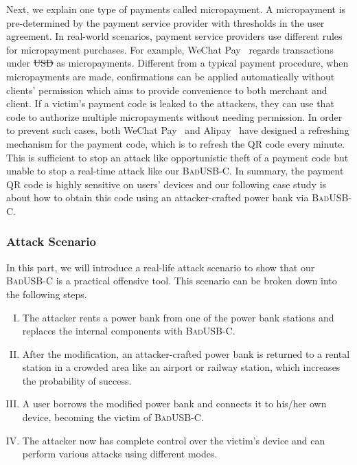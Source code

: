 \documentclass[conference]{IEEEtran}
\newcommand{\tool}{\mbox{\textsc{BadUSB-C}}\xspace}
\providecommand{\DIFaddtex}[1]{{\protect\color{blue}\uwave{#1}}} %
\providecommand{\DIFdeltex}[1]{{\protect\color{red}\sout{#1}}}                      %
\providecommand{\DIFaddbegin}{} %
\providecommand{\DIFaddend}{} %
\providecommand{\DIFdelbegin}{} %
\providecommand{\DIFdelend}{} %
\providecommand{\DIFadd}[1]{\texorpdfstring{\DIFaddtex{#1}}{#1}} %
\providecommand{\DIFdel}[1]{\texorpdfstring{\DIFdeltex{#1}}{}} %
\newcommand{\DIFscaledelfig}{0.5}
\newlength{\DIFdelgraphicswidth} %
\newlength{\DIFdelgraphicsheight} %
\newcommand{\DIFaddincludegraphics}[2][]{{\color{blue}\fbox{\DIFOincludegraphics[#1]{#2}}}} %
\newcommand{\DIFdelincludegraphics}[2][]{%
\sbox{\DIFdelgraphicsbox}{\DIFOincludegraphics[#1]{#2}}%
\settoboxwidth{\DIFdelgraphicswidth}{\DIFdelgraphicsbox} %
\settoboxtotalheight{\DIFdelgraphicsheight}{\DIFdelgraphicsbox} %
\scalebox{\DIFscaledelfig}{%
\parbox[b]{\DIFdelgraphicswidth}{\usebox{\DIFdelgraphicsbox}\\[-\baselineskip] \rule{\DIFdelgraphicswidth}{0em}}\llap{\resizebox{\DIFdelgraphicswidth}{\DIFdelgraphicsheight}{%
\setlength{\unitlength}{\DIFdelgraphicswidth}%
\begin{picture}(1,1)%
\thicklines\linethickness{2pt} %
{\color[rgb]{1,0,0}\put(0,0){\framebox(1,1){}}}%
{\color[rgb]{1,0,0}\put(0,0){\line( 1,1){1}}}%
{\color[rgb]{1,0,0}\put(0,1){\line(1,-1){1}}}%
\end{picture}%
}\hspace*{3pt}}} %
} %
\DeclareRobustCommand{\DIFaddbegin}{\DIFOaddbegin \let\includegraphics\DIFaddincludegraphics} %
\DeclareRobustCommand{\DIFaddend}{\DIFOaddend \let\includegraphics\DIFOincludegraphics} %
\DeclareRobustCommand{\DIFdelbegin}{\DIFOdelbegin \let\includegraphics\DIFdelincludegraphics} %
\DeclareRobustCommand{\DIFdelend}{\DIFOaddend \let\includegraphics\DIFOincludegraphics} %
\begin{document}
Next, we explain one type of payments called micropayment. A micropayment is pre-determined by the payment
service provider with thresholds in the user agreement. In real-world scenarios, payment service providers use different rules
for micropayment purchases. For example, WeChat
Pay~\cite{Wechat-pay} regards transactions under \DIFdelbegin \DIFdel{USD }\DIFdelend \DIFaddbegin \DIFadd{US}\DIFaddend {} as
micropayments.  Different from a typical payment procedure, when micropayments
are made, confirmations can be applied automatically without clients'
permission which aims to provide convenience to both merchant and client.  If a
victim's payment code is leaked to the attackers, they can use that code to
authorize multiple micropayments without needing permission.  In order to prevent such
cases, both WeChat Pay~\cite{Wechat-pay} and Alipay~\cite{AliPay} have designed a refreshing mechanism for the
payment code, which is to refresh the QR code every minute. This is sufficient
to stop an attack like opportunistic theft of a payment code but unable to stop a real-time attack like our
\tool.  In summary, the payment QR code is highly sensitive on users' devices
and our following case study is about how to obtain this code using an
attacker-crafted power bank via \tool.

\subsubsection{Attack Scenario}
\DIFaddbegin \label{subsec:attack-scenario}
\DIFaddend 

In this part, we will introduce a real-life attack scenario to show that our
\tool is a practical offensive tool.  This scenario can be broken down into the
following steps.

\begin{enumerate}[I. ]
	\item The attacker rents a power bank from one of the power bank stations and replaces the internal components with \tool.
	\item After the modification, an attacker-crafted power bank is returned to a rental station in a crowded area like an airport or railway station, which increases the probability of success.
	\item A user borrows the modified power bank and connects it to his/her own device, becoming the victim of \tool.
	\item The attacker now has complete control over the victim's device and can perform various attacks using different modes.
\end{enumerate}
\end{document}
